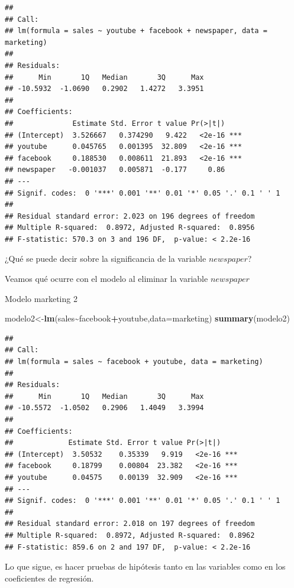 \documentclass[
]{book}
\newenvironment{Shaded}{\begin{snugshade}}{\end{snugshade}}
\newcommand{\AttributeTok}[1]{\textcolor[rgb]{0.13,0.29,0.53}{#1}}
\newcommand{\FunctionTok}[1]{\textcolor[rgb]{0.13,0.29,0.53}{\textbf{#1}}}
\newcommand{\NormalTok}[1]{#1}
\newcommand{\OtherTok}[1]{\textcolor[rgb]{0.56,0.35,0.01}{#1}}
\newcommand{\SpecialCharTok}[1]{\textcolor[rgb]{0.81,0.36,0.00}{\textbf{#1}}}
\begin{document}
\begin{verbatim}
## 
## Call:
## lm(formula = sales ~ youtube + facebook + newspaper, data = marketing)
## 
## Residuals:
##      Min       1Q   Median       3Q      Max 
## -10.5932  -1.0690   0.2902   1.4272   3.3951 
## 
## Coefficients:
##              Estimate Std. Error t value Pr(>|t|)    
## (Intercept)  3.526667   0.374290   9.422   <2e-16 ***
## youtube      0.045765   0.001395  32.809   <2e-16 ***
## facebook     0.188530   0.008611  21.893   <2e-16 ***
## newspaper   -0.001037   0.005871  -0.177     0.86    
## ---
## Signif. codes:  0 '***' 0.001 '**' 0.01 '*' 0.05 '.' 0.1 ' ' 1
## 
## Residual standard error: 2.023 on 196 degrees of freedom
## Multiple R-squared:  0.8972, Adjusted R-squared:  0.8956 
## F-statistic: 570.3 on 3 and 196 DF,  p-value: < 2.2e-16
\end{verbatim}

¿Qué se puede decir sobre la significancia de la variable \(newspaper\)?

Veamos qué ocurre con el modelo al eliminar la variable \(newspaper\)

Modelo marketing 2

\begin{Shaded}
\begin{Highlighting}[]
\NormalTok{modelo2}\OtherTok{\textless{}{-}}\FunctionTok{lm}\NormalTok{(sales}\SpecialCharTok{\textasciitilde{}}\NormalTok{facebook}\SpecialCharTok{+}\NormalTok{youtube,}\AttributeTok{data=}\NormalTok{marketing)}
\FunctionTok{summary}\NormalTok{(modelo2)}
\end{Highlighting}
\end{Shaded}

\begin{verbatim}
## 
## Call:
## lm(formula = sales ~ facebook + youtube, data = marketing)
## 
## Residuals:
##      Min       1Q   Median       3Q      Max 
## -10.5572  -1.0502   0.2906   1.4049   3.3994 
## 
## Coefficients:
##             Estimate Std. Error t value Pr(>|t|)    
## (Intercept)  3.50532    0.35339   9.919   <2e-16 ***
## facebook     0.18799    0.00804  23.382   <2e-16 ***
## youtube      0.04575    0.00139  32.909   <2e-16 ***
## ---
## Signif. codes:  0 '***' 0.001 '**' 0.01 '*' 0.05 '.' 0.1 ' ' 1
## 
## Residual standard error: 2.018 on 197 degrees of freedom
## Multiple R-squared:  0.8972, Adjusted R-squared:  0.8962 
## F-statistic: 859.6 on 2 and 197 DF,  p-value: < 2.2e-16
\end{verbatim}

Lo que sigue, es hacer pruebas de hipótesis tanto en las variables como en los coeficientes de regresión.
\end{document}
